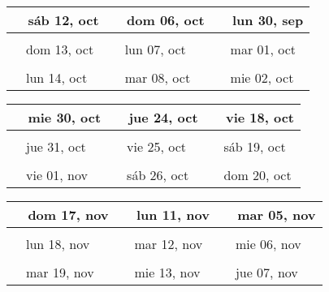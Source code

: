 \documentclass[letterpaper,10pt]{article}
\begin{document}
\begin{tabular}{lll}
\\
{\ \ sáb 12, oct\hspace{4.5cm}\vspace{2.25cm}} &{\ \ dom 06, oct\hspace{4.5cm}} &{\ \ lun 30, sep\hspace{4.5cm}}
\\ \hline \\
{\ \ dom 13, oct\vspace{2.25cm}} & {\ \ lun 07, oct} & {\ \ mar 01, oct}
\\ \hline \\
{\ \ lun 14, oct\vspace{2.25cm}} & {\ \ mar 08, oct} & {\ \ mie 02, oct}
\\
\end{tabular}\par
\begin{tabular}{lll}
\\
{\ \ mie 30, oct\hspace{4.5cm}\vspace{2.25cm}} &{\ \ jue 24, oct\hspace{4.5cm}} &{\ \ vie 18, oct\hspace{4.5cm}}
\\ \hline \\
{\ \ jue 31, oct\vspace{2.25cm}} & {\ \ vie 25, oct} & {\ \ sáb 19, oct}
\\ \hline \\
{\ \ vie 01, nov\vspace{2.25cm}} & {\ \ sáb 26, oct} & {\ \ dom 20, oct}
\\
\end{tabular}\par
\begin{tabular}{lll}
\\
{\ \ dom 17, nov\hspace{4.5cm}\vspace{2.25cm}} &{\ \ lun 11, nov\hspace{4.5cm}} &{\ \ mar 05, nov\hspace{4.5cm}}
\\ \hline \\
{\ \ lun 18, nov\vspace{2.25cm}} & {\ \ mar 12, nov} & {\ \ mie 06, nov}
\\ \hline \\
{\ \ mar 19, nov\vspace{2.25cm}} & {\ \ mie 13, nov} & {\ \ jue 07, nov}
\\
\end{tabular}\par
\end{document}
